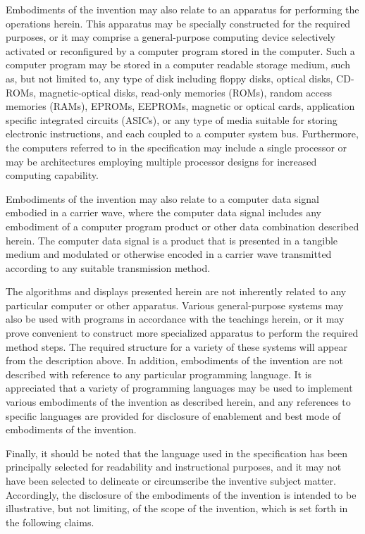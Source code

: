 Embodiments of the
invention may also relate to an apparatus for performing the
operations herein. This apparatus may be specially constructed for the
required purposes, or it may comprise a general-purpose computing
device selectively activated or reconfigured by a computer program
stored in the computer. Such a computer program may be stored in a
computer readable storage medium, such as, but not limited to, any
type of disk including floppy disks, optical disks, CD-ROMs,
magnetic-optical disks, read-only memories (ROMs), random access
memories (RAMs), EPROMs, EEPROMs, magnetic or optical cards,
application specific integrated circuits (ASICs), or any type of media
suitable for storing electronic instructions, and each coupled to a
computer system bus. Furthermore, the computers referred to in the
specification may include a single processor or may be architectures
employing multiple processor designs for increased computing
capability.



Embodiments of the invention may
also relate to a computer data signal embodied in a carrier wave,
where the computer data signal includes any embodiment of a computer
program product or other data combination described herein. The
computer data signal is a product that is presented in a tangible
medium and modulated or otherwise encoded in a carrier wave
transmitted according to any suitable transmission method.



The algorithms and displays presented herein
are not inherently related to any particular computer or other
apparatus. Various general-purpose systems may also be used with
programs in accordance with the teachings herein, or it may prove
convenient to construct more specialized apparatus to perform the
required method steps. The required structure for a variety of these
systems will appear from the description above. In addition,
embodiments of the invention are not described with reference to any
particular programming language. It is appreciated that a variety of
programming languages may be used to implement various embodiments of
the invention as described herein, and any references to specific
languages are provided for disclosure of enablement and best mode of
embodiments of the invention.



Finally, it
should be noted that the language used in the specification has been
principally selected for readability and instructional purposes, and
it may not have been selected to delineate or circumscribe the
inventive subject matter. Accordingly, the disclosure of the
embodiments of the invention is intended to be illustrative, but not
limiting, of the scope of the invention, which is set forth in the
following claims.  


